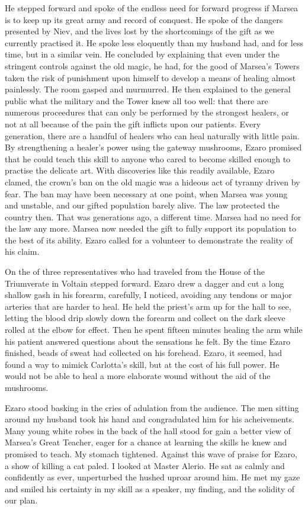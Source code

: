 \documentclass{article}
\begin{document}
He stepped forward and spoke of the endless need for forward progress if Marsea is to keep up its great army and record of conquest. He spoke of the dangers presented by Niev, and the lives lost by the shortcomings of the gift as we currently practised it. He spoke less eloquently than my husband had, and for less time, but in a similar vein. He concluded by explaining that even under the stringent controls against the old magic, he had, for the good of Marsea's Towers taken the risk of punishment upon himself to develop a means of healing almost painlessly. The room gasped and murmurred. He then explained to the general public what the military and the Tower knew all too well: that there are numerous proceedures that can only be performed by the strongest healers, or not at all because of the pain the gift inflicts upon our patients. Every generation, there are a handful of healers who can heal naturally with little pain. By strengthening a healer's power using the gateway mushrooms, Ezaro promised that he could teach this skill to anyone who cared to become skilled enough to practise the delicate art. With discoveries like this readily available, Ezaro clamed, the crown's ban on the old magic was a hideous act of tyranny driven by fear. The ban may have been necessary at one point, when Marsea was young and unstable, and our gifted population barely alive. The law protected the country then. That was generations ago, a different time. Marsea had no need for the law any more. Marsea now needed the gift to fully support its population to the best of its ability. Ezaro called for a volunteer to demonstrate the reality of his claim. 

On the of three representatives who had traveled from the House of the Triumverate in Voltain stepped forward. Ezaro drew a dagger and cut a long shallow gash in his forearm, carefully, I noticed, avoiding any tendons or major arteries that are harder to heal. He held the priest's arm up for the hall to see, letting the blood drip slowly down the forearm and collect on the dark sleeve rolled at the elbow for effect. Then he spent fifteen minutes healing the arm while his patient answered questions about the sensations he felt. By the time Ezaro finished, beads of sweat had collected on his forehead. Ezaro, it seemed, had found a way to mimick Carlotta's skill, but at the cost of his full power. He would not be able to heal a more elaborate wound without the aid of the mushrooms. 

Ezaro stood basking in the cries of adulation from the audience. The men sitting around my husband took his hand and congradulated him for his acheivements. Many young white robes in the back of the hall stood for gain a better view of Marsea's Great Teacher, eager for a chance at learning the skills he knew and promised to teach. My stomach tightened. Against this wave of praise for Ezaro, a show of killing a cat paled. I looked at Master Alerio. He sat as calmly and confidently as ever, unperturbed the hushed uproar around him. He met my gaze and smiled his certainty in my skill as a speaker, my finding, and the solidity of our plan. 
\end{document}
